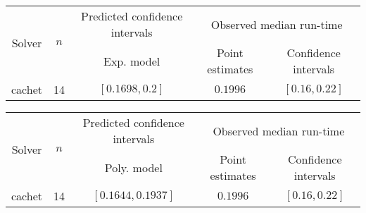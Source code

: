 \begin{tabular}{ccccc}
\hline 
\multirow{2}{*}{Solver} & \multirow{2}{*}{$n$} & Predicted confidence intervals & \multicolumn{2}{c}{Observed median  run-time}\tabularnewline
 &  & Exp. model  & Point estimates  & Confidence intervals\tabularnewline
\hline 
\hline 
\multirow{0}{*}{cachet} & 14 & $\mathbf{\left[0.1698,0.2\right]}$ & $0.1996$ & $\left[0.16,0.22\right]$ \tabularnewline 
\hline 
\end{tabular} 

\begin{tabular}{ccccc}
\hline 
\multirow{2}{*}{Solver} & \multirow{2}{*}{$n$} & Predicted confidence intervals & \multicolumn{2}{c}{Observed median  run-time}\tabularnewline
 &  & Poly. model  & Point estimates  & Confidence intervals\tabularnewline
\hline 
\hline 
\multirow{0}{*}{cachet} & 14 & $\mathbf{\left[0.1644,0.1937\right]}$ & $0.1996$ & $\left[0.16,0.22\right]$ \tabularnewline 
\hline 
\end{tabular} 


